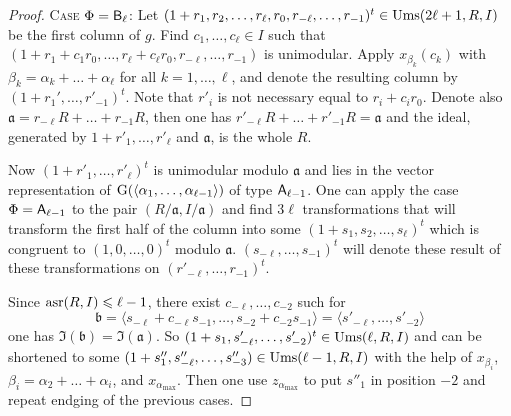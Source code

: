 \begin{proof}
\textsc{Case $\Phi=\mathsf{B}_\ell$:}
Let $(1+r_1,r_2,\dots,r_\ell,r_0,r_{-\ell},\dots,r_{-1})^t\in\operatorname{Ums}(2\ell+1,R,I)$ be the first column of $g$. Find $c_1,\dots,c_\ell\in I$ such that $(1+r_1+c_1r_0,\dots,r_\ell+c_\ell r_0,r_{-\ell},\dots,r_{-1})$ is unimodular. Apply $x_{\beta_k}(c_k)$ with $\beta_k=\alpha_k+\dots+\alpha_\ell$ for all $k=1,\dots,\ell$, and denote the resulting column by $(1+r_1',\dots,r'_{-1})^t$. Note that $r'_i$ is not necessary equal to $r_i+c_ir_0$. Denote also $\mathfrak{a}=r_{-\ell}R+\dots+r_{-1}R$, then one has $r'_{-\ell}R+\dots+r'_{-1}R=\mathfrak{a}$ and the ideal, generated by $1+r'_1,\dots,r'_\ell$ and $\mathfrak{a}$, is the whole $R$.

Now $(1+r'_1,\dots,r'_\ell)^t$ is unimodular modulo $\mathfrak{a}$ and lies in the vector representation of $\operatorname{G}(\langle\alpha_1,\dots,\alpha_{\ell-1}\rangle)$ of type $\mathsf{A}_{\ell-1}$. One can apply the case $\Phi=\mathsf{A}_{\ell-1}$ to the pair $(R/\mathfrak{a},I/\mathfrak{a})$ and find $3\ell$ transformations that will transform the first half of the column into some $(1+s_1,s_2,\dots,s_\ell)^t$ which is congruent to $(1,0,\dots,0)^t$ modulo $\mathfrak{a}$. $(s_{-\ell},\dots,s_{-1})^t$ will denote these result of these transformations on $(r'_{-\ell},\dots,r_{-1})^t$.

Since $\operatorname{asr}(R,I)\leqslant\ell-1$, there exist $c_{-\ell},\dots,c_{-2}$ such for
\[ \mathfrak{b}=\langle s_{-\ell}+c_{-\ell}s_{-1},\dots,s_{-2}+c_{-2}s_{-1}\rangle=\langle s'_{-\ell},\ldots,s'_{-2}\rangle \]
one has $\mathfrak{I}(\mathfrak{b})=\mathfrak{I}(\mathfrak{a})$. So $(1+s_1,s'_{-\ell},\ldots,s'_{-2})^t\in\operatorname{Ums}(\ell,R,I)$ and can be shortened to some $(1+s''_1,s''_{-\ell},\ldots,s''_{-3})\in\operatorname{Ums}(\ell-1,R,I)$ with the help of $x_{\beta_i}$, $\beta_i=\alpha_2+\ldots+\alpha_i$, and $x_{\alpha_{\max}}$. Then one use $z_{\alpha_{\max}}$ to put $s''_1$ in position $-2$ and repeat endging of the previous cases.
\end{proof}